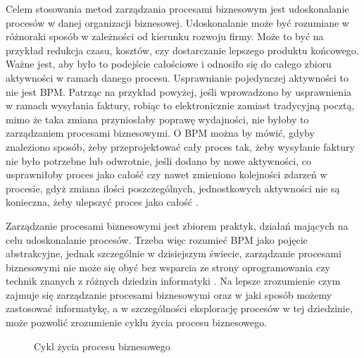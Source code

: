Celem stosowania metod zarządzania procesami biznesowym jest udoskonalanie procesów w danej organizacji biznesowej. Udoskonalanie może być rozumiane w różnoraki sposób w zależności od kierunku rozwoju firmy. Może to być na przykład redukcja czasu, kosztów, czy dostarczanie lepszego produktu końcowego. Ważne jest, aby było to podejście całościowe i odnosiło się do całego zbioru aktywności w ramach danego procesu. Usprawnianie pojedynczej aktywności to nie jest BPM. Patrząc na przykład powyżej, jeśli wprowadzono by usprawnienia w ramach wysyłania faktury, robiąc to elektronicznie zamiast tradycyjną pocztą, mimo że taka zmiana przyniosłaby poprawę wydajności, nie byłoby to zarządzaniem procesami biznesowymi. O BPM można by mówić, gdyby znaleziono sposób, żeby przeprojektować cały proces tak, żeby wysyłanie faktury nie było potrzebne lub odwrotnie, jeśli dodano by nowe aktywności, co usprawniłoby proces jako całość czy nawet zmieniono kolejności zdarzeń w procesie, gdyż zmiana ilości poszczególnych, jednostkowych aktywności nie są konieczna, żeby ulepszyć proces jako całość \cite{BPMWhat}.

Zarządzanie procesami biznesowymi jest zbiorem praktyk, działań mających na celu udoskonalanie procesów. Trzeba więc rozumieć BPM jako pojęcie abstrakcyjne, jednak szczególnie w dzisiejszym świecie, zarządzanie procesami biznesowymi nie może się obyć bez wsparcia ze strony oprogramowania czy technik znanych z różnych dziedzin informatyki \cite{BPMSurvey}. Na lepsze zrozumienie czym zajmuje się zarządzanie procesami biznesowymi oraz w jaki sposób możemy zastosować informatykę, a w szczególności eksplorację procesów w tej dziedzinie, może pozwolić zrozumienie cyklu życia procesu biznesowego.

\begin{figure}[h]
	\caption{\label{fig:lifecycle}Cykl życia procesu biznesowego}
\end{figure}

